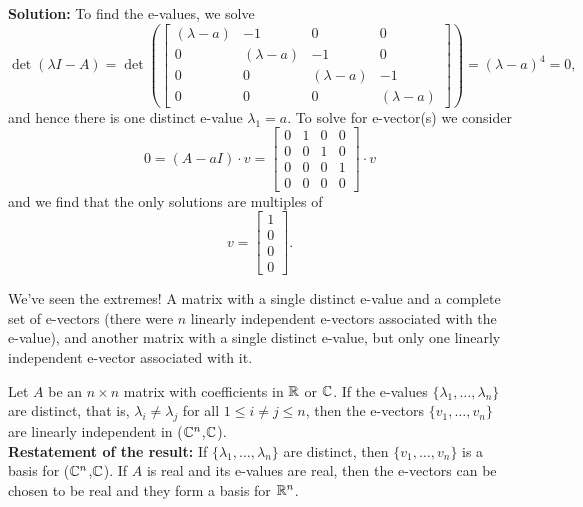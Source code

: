 \textbf{Solution:} To find the e-values, we solve
$$\det(\lambda I - A) =  \det\left(\left[\begin{array}{cccc} (\lambda-a) & -1 & 0 & 0\\
0 & (\lambda-a) & -1 & 0\\
0& 0& (\lambda-a) & -1\\
0& 0& 0 & (\lambda-a)\end{array}\right] \right) = (\lambda-a)^4=0,$$
and hence there is one distinct e-value $\lambda_1 = a$. To solve for e-vector(s) we consider
$$0=(A - a I) \cdot v = \left[\begin{array}{cccc} 0 & 1 & 0 & 0\\
0 & 0 & 1 & 0\\
0& 0& 0 & 1\\
0& 0& 0 & 0\end{array}\right] \cdot v$$
and we find that the only solutions are multiples of 
$$v=\left[\begin{array}{c} 1 \\ 0 \\ 0 \\ 0 \end{array}\right].$$
\Qed
\vspace*{0.5cm}
\begin{tcolorbox}
We've seen the extremes! A matrix with a single distinct e-value and a complete set of e-vectors (there were $n$ linearly independent e-vectors associated with the e-value), and another matrix with a single distinct e-value, but only one linearly independent e-vector associated with it. 
\end{tcolorbox}
\vspace*{0.5cm}
\begin{tcolorbox}[sharp corners, colback=green!30, colframe=green!80!blue, title=\textbf{\large When the e-values are Distinct, the e-vectors form a Basis}]
Let $A$ be an $n \times n$ matrix with coefficients in $\mathbb R$ or $\mathbb C$. If the e-values $\{ \lambda_1,\ldots, \lambda_n \}$ are distinct, that is, $\lambda_i \neq \lambda_j $ for all $1 \le i \neq j \le n$, then the e-vectors $\{ v_1,\ldots,v_n \}$ are linearly independent in ($\mathbb C^n$,$\mathbb C$).\\

\textbf{Restatement of the result:} If $\{ \lambda_1,\ldots,\lambda_n \}$ are distinct, then $\{ v_1,\ldots,v_n \}$ is a basis for ($\mathbb C^n$,$\mathbb C$). If $A$ is real and its e-values are real, then the e-vectors can be chosen to be real and they form a basis for $\mathbb R^n$.
\end{tcolorbox}

